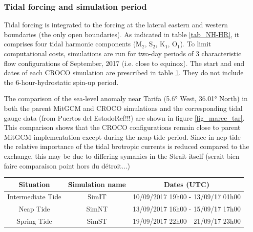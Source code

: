 \subsubsection{Tidal forcing and simulation period}
Tidal forcing is integrated to the forcing at the lateral eastern and western boundaries (the only open boundaries). As indicated in table \ref{tab_NH-HR}, it comprises four tidal harmonic components ($\text{M}_{\text{2}}$, $\text{S}_{\text{2}}$, $\text{K}_{\text{1}}$, $\text{O}_{\text{1}}$). To limit computational costs, simulations are run for two-day periods of 3 characteristic flow configurations of September, 2017 (i.e. close to equinox). The start and end dates of each CROCO simulation are prescribed in table \ref{tab_dates_MIV}. They do not include the 6-hour-hydrostatic spin-up period.

The comparison of the sea-level anomaly near Tarifa (5.6° West, 36.01° North) in both the parent MitGCM and CROCO simulations and the corresponding tidal gauge data (from Puertos del Estado\color{red}Ref!!!\color{black}) are shown in figure \ref{fig_maree_tar}. \color{blue} This comparison shows that the CROCO configurations remain close to parent MitGCM implementation except during the neap tide period. \color{red}Since in nep tide the relative importance of the tidal brotropic currents is reduced compared to the exchange, this may be due to differing symanics in the Strait itself (serait bien faire comparaison point hors du détroit...) \color{black}

\begin{table}[h]
        \centering
        \begin{tabular}{|c|c|c|}
                \hline
                Situation & Simulation name & Dates (UTC)\\
                \hline
                Intermediate Tide & SimIT & 10/09/2017 19h00 - 13/09/17 01h00  \\
                Neap Tide & SimNT & 13/09/2017 16h00 - 15/09/17 17h00 \\
                Spring Tide & SimST & 19/09/2017 22h00 - 21/09/17 23h00  \\
                \hline
        \end{tabular}
        \label{tab_dates_MIV}
\end{table}

